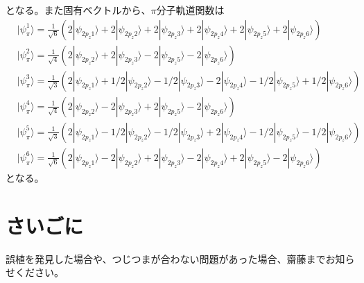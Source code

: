 \documentclass[11pt,pra,aps]{revtex4}
\begin{document}
となる。また固有ベクトルから、$\pi$分子軌道関数は
\begin{align}
  &|\psi_\pi^1\rangle=\frac{1}{\sqrt{6}}(2|\psi_{2p_z\text{1}}\rangle +   2|\psi_{2p_z\text{2}}\rangle +   2|\psi_{2p_z\text{3}}\rangle + 2|\psi_{2p_z\text{4}}\rangle +   2|\psi_{2p_z\text{5}}\rangle +   2|\psi_{2p_z\text{6}}\rangle) \\
  &|\psi_\pi^2\rangle=\frac{1}{\sqrt{4}}(                                 2|\psi_{2p_z\text{2}}\rangle +   2|\psi_{2p_z\text{3}}\rangle                                -   2|\psi_{2p_z\text{5}}\rangle -   2|\psi_{2p_z\text{6}}\rangle) \\
  &|\psi_\pi^3\rangle=\frac{1}{\sqrt{3}}(2|\psi_{2p_z\text{1}}\rangle + 1/2|\psi_{2p_z\text{2}}\rangle - 1/2|\psi_{2p_z\text{3}}\rangle - 2|\psi_{2p_z\text{4}}\rangle - 1/2|\psi_{2p_z\text{5}}\rangle + 1/2|\psi_{2p_z\text{6}}\rangle) \\
  &|\psi_\pi^4\rangle=\frac{1}{\sqrt{4}}(                                 2|\psi_{2p_z\text{2}}\rangle -   2|\psi_{2p_z\text{3}}\rangle                                +   2|\psi_{2p_z\text{5}}\rangle -   2|\psi_{2p_z\text{6}}\rangle) \\
  &|\psi_\pi^5\rangle=\frac{1}{\sqrt{3}}(2|\psi_{2p_z\text{1}}\rangle - 1/2|\psi_{2p_z\text{2}}\rangle - 1/2|\psi_{2p_z\text{3}}\rangle + 2|\psi_{2p_z\text{4}}\rangle - 1/2|\psi_{2p_z\text{5}}\rangle - 1/2|\psi_{2p_z\text{6}}\rangle) \\
  &|\psi_\pi^6\rangle=\frac{1}{\sqrt{6}}(2|\psi_{2p_z\text{1}}\rangle -   2|\psi_{2p_z\text{2}}\rangle +   2|\psi_{2p_z\text{3}}\rangle - 2|\psi_{2p_z\text{4}}\rangle +   2|\psi_{2p_z\text{5}}\rangle -   2|\psi_{2p_z\text{6}}\rangle) 
\end{align}
となる。

\section{さいごに}

誤植を発見した場合や、つじつまが合わない問題があった場合、齋藤までお知らせください。
\end{document}
